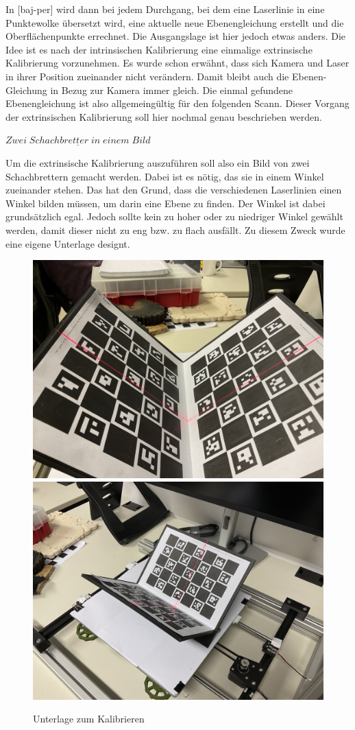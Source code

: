 		In [baj-per] wird dann bei jedem Durchgang, bei dem eine Laserlinie in eine Punktewolke übersetzt wird, eine aktuelle neue Ebenengleichung erstellt und die Oberflächenpunkte errechnet. Die Ausgangslage ist hier jedoch etwas anders. Die Idee ist es nach der intrinsischen Kalibrierung eine einmalige extrinsische Kalibrierung vorzunehmen. Es wurde schon erwähnt, dass sich Kamera und Laser in ihrer Position zueinander nicht verändern. Damit bleibt auch die Ebenen-Gleichung in Bezug zur Kamera immer gleich. Die einmal  gefundene Ebenengleichung ist also allgemeingültig für den folgenden Scann. Dieser Vorgang der extrinsischen Kalibrierung soll hier nochmal genau beschrieben werden.
		
		$\underline{Zwei \; Schachbretter \; in \; einem \; Bild}$
		
		Um die extrinsische Kalibrierung auszuführen soll also ein Bild von zwei Schachbrettern gemacht werden. Dabei ist es nötig, das sie in einem Winkel zueinander stehen. Das hat den Grund, dass die verschiedenen Laserlinien einen Winkel bilden müssen, um darin eine Ebene zu finden. Der Winkel ist dabei grundsätzlich egal. Jedoch sollte kein zu hoher oder zu niedriger Winkel gewählt werden, damit dieser nicht zu eng bzw. zu flach ausfällt. Zu diesem Zweck wurde eine eigene Unterlage designt.
		
		\begin{figure}[h]
			\centering
			\includegraphics[width=0.49\linewidth]{img/hauptteil/ext-calib/pattern_0.jpg}
			\includegraphics[width=0.49\linewidth]{img/hauptteil/ext-calib/pattern_1.jpg}
			\caption{Unterlage zum Kalibrieren}
			\label{fig:ext-calib-pattern}
		\end{figure} 
	
